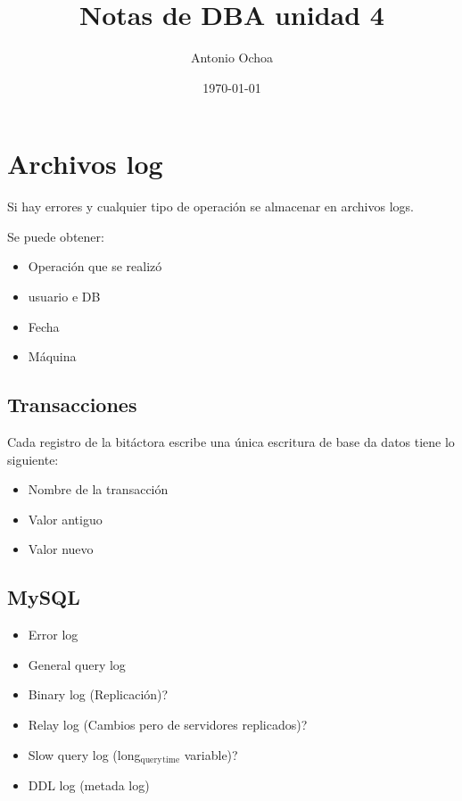 \documentclass[11pt]{article}
\author{Antonio Ochoa}
\date{\today}
\title{Notas de DBA unidad 4}
\begin{document}
\maketitle
\tableofcontents


\section{Archivos log}
\label{sec-1}
Si hay errores y cualquier tipo de operación se almacenar en archivos logs.

Se puede obtener:

\begin{itemize}
\item Operación que se realizó
\item usuario e DB
\item Fecha
\item Máquina
\end{itemize}

\subsection{Transacciones}
\label{sec-1-1}

Cada registro de la bitáctora escribe una única escritura de base da datos
tiene lo siguiente:

\begin{itemize}
\item Nombre de la transacción
\item Valor antiguo
\item Valor nuevo
\end{itemize}

\subsection{MySQL}
\label{sec-1-2}
\begin{itemize}
\item Error log
\item General query log
\item Binary log (Replicación)?
\item Relay log (Cambios pero de servidores replicados)?
\item Slow query log (long$_{\text{query}}$$_{\text{time}}$ variable)?
\item DDL log (metada log)
\end{itemize}
\end{document}
